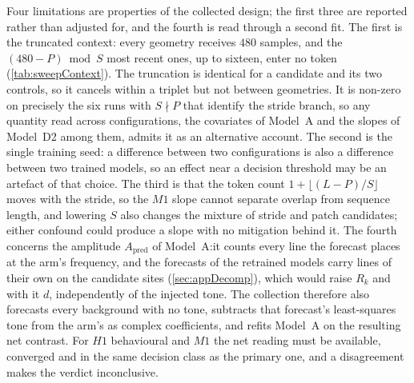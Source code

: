 Four limitations are properties of the collected design; the first three are reported rather than adjusted for, and the fourth is read through a second fit. The first is the truncated context: every geometry receives $480$ samples, and the $(480-P)\bmod S$ most recent ones, up to sixteen, enter no token (\autoref{tab:sweepContext}). The truncation is identical for a candidate and its two controls, so it cancels within a triplet but not between geometries. It is non-zero on precisely the six runs with $S\nmid P$ that identify the stride branch, so any quantity read across configurations, the covariates of Model~A and the slopes of Model~D2 among them, admits it as an alternative account. The second is the single training seed: a difference between two configurations is also a difference between two trained models, so an effect near a decision threshold may be an artefact of that choice. The third is that the token count $1+\lfloor(L-P)/S\rfloor$ moves with the stride, so the $M1$ slope cannot separate overlap from sequence length, and lowering $S$ also changes the mixture of stride and patch candidates; either confound could produce a slope with no mitigation behind it. The fourth concerns the amplitude $A_{\mathrm{pred}}$ of Model~A:\@ it counts every line the forecast places at the arm's frequency, and the forecasts of the retrained models carry lines of their own on the candidate sites (\autoref{sec:appDecomp}), which would raise $R_k$ and with it $d$, independently of the injected tone. The collection therefore also forecasts every background with no tone, subtracts that forecast's least-squares tone from the arm's as complex coefficients, and refits Model~A on the resulting net contrast. For $H1$ behavioural and $M1$ the net reading must be available, converged and in the same decision class as the primary one, and a disagreement makes the verdict inconclusive.
